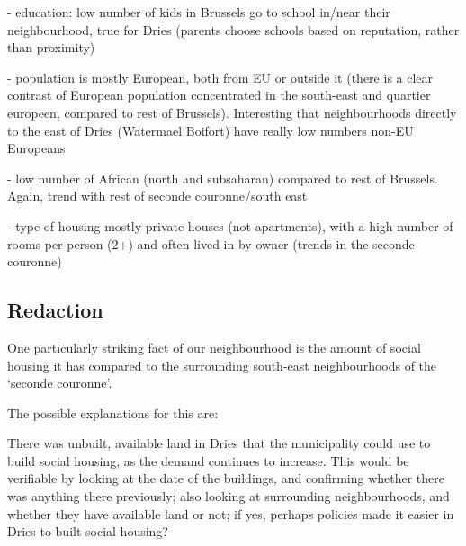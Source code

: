 \documentclass{article}
\begin{document}
- education: low number of kids in Brussels go to school in/near their neighbourhood, true for Dries (parents choose schools based on reputation, rather than proximity)

- population is mostly European, both from EU or outside it (there is a clear contrast of European population concentrated in the south-east and quartier europeen, compared to rest of Brussels). Interesting that neighbourhoods directly to the east of Dries (Watermael Boifort) have really low numbers non-EU Europeans

- low number of African (north and subsaharan) compared to rest of Brussels. Again, trend with rest of seconde couronne/south east 

- type of housing mostly private houses (not apartments), with a high number of rooms per person (2+) and often lived in by owner (trends in the seconde couronne)

\subsection{Redaction}

One particularly striking fact of our neighbourhood is the amount of social housing it has compared to the surrounding south-east neighbourhoods of the `seconde couronne'. 

The possible explanations for this are:

\begin{outline}
	\1 There was unbuilt, available land in Dries that the municipality could use to build social housing, as the demand continues to increase. This would be verifiable by looking at the date of the buildings, and confirming whether there was anything there previously; also looking at surrounding neighbourhoods, and whether they have available land or not; if yes, perhaps policies made it easier in Dries to built social housing?
	\1
\end{outline}
\end{document}
